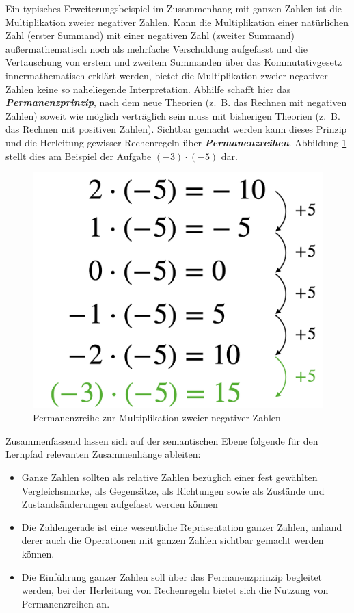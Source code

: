 \documentclass[
]{scrbook}
\providecommand{\tightlist}{%
  \setlength{\itemsep}{0pt}\setlength{\parskip}{0pt}}
\theoremstyle{definition}
\theoremstyle{definition}
\theoremstyle{definition}
\theoremstyle{definition}
\theoremstyle{remark}
\begin{document}
Ein typisches Erweiterungsbeispiel im Zusammenhang mit ganzen Zahlen ist die Multiplikation zweier negativer Zahlen. Kann die Multiplikation einer natürlichen Zahl (erster Summand) mit einer negativen Zahl (zweiter Summand) außermathematisch noch als mehrfache Verschuldung aufgefasst und die Vertauschung von erstem und zweitem Summanden über das Kommutativgesetz innermathematisch erklärt werden, bietet die Multiplikation zweier negativer Zahlen keine so naheliegende Interpretation. Abhilfe schafft hier das \textbf{\emph{Permanenzprinzip}}, nach dem neue Theorien (z.~B. das Rechnen mit negativen Zahlen) soweit wie möglich verträglich sein muss mit bisherigen Theorien (z.~B. das Rechnen mit positiven Zahlen). Sichtbar gemacht werden kann dieses Prinzip und die Herleitung gewisser Rechenregeln über \textbf{\emph{Permanenzreihen}}. Abbildung \ref{fig:Permanenz} stellt dies am Beispiel der Aufgabe \((-3)\cdot (-5)\) dar.

\begin{figure}

{\centering \includegraphics[width=0.5\linewidth]{pictures/9-Permanenz} 

}

\caption{Permanenzreihe zur Multiplikation zweier negativer Zahlen}\label{fig:Permanenz}
\end{figure}

Zusammenfassend lassen sich auf der semantischen Ebene folgende für den Lernpfad relevanten Zusammenhänge ableiten:

\begin{itemize}
\tightlist
\item
  \textcolor{semanticColor}{Ganze Zahlen sollten als relative Zahlen bezüglich einer fest gewählten Vergleichsmarke, als Gegensätze, als Richtungen sowie als Zustände und Zustandsänderungen aufgefasst werden können}\\
\item
  \textcolor{semanticColor}{Die Zahlengerade ist eine wesentliche Repräsentation ganzer Zahlen, anhand derer auch die Operationen mit ganzen Zahlen sichtbar gemacht werden können.}\\
\item
  \textcolor{semanticColor}{Die Einführung ganzer Zahlen soll über das Permanenzprinzip begleitet werden, bei der Herleitung von Rechenregeln bietet sich die Nutzung von Permanenzreihen an.}
\end{itemize}
\end{document}
